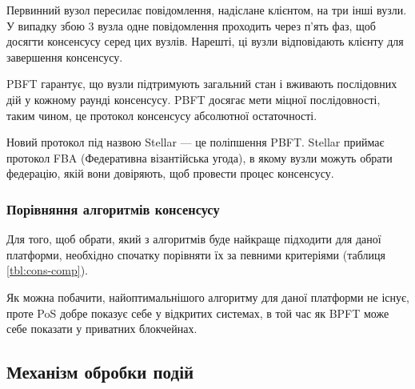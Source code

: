 \documentclass{lib/styles/default-style}
\begin{document}
    Первинний вузол пересилає повідомлення, надіслане клієнтом, на три інші вузли.
    У випадку збою 3 вузла одне повідомлення проходить через п'ять фаз, щоб досягти консенсусу серед цих вузлів.
    Нарешті, ці вузли відповідають клієнту для завершення консенсусу.

    PBFT гарантує, що вузли підтримують загальний стан і вживають послідовних дій у кожному раунді консенсусу.
    PBFT досягає мети міцної послідовності, таким чином, це протокол консенсусу абсолютної остаточності.
    
    Новий протокол під назвою Stellar --- це поліпшення PBFT.
    Stellar приймає протокол FBA (Федеративна візантійська угода), в якому вузли можуть обрати федерацію,
    якій вони довіряють, щоб провести процес консенсусу.

    \subsubsection{Порівняння алгоритмів консенсусу}

    Для того, щоб обрати, який з алгоритмів буде найкраще підходити для
    даної платформи, необхідно спочатку порівняти їх за певними критеріями (таблиця \ref{tbl:cons-comp}).

    
    Як можна побачити, найоптимальнішого алгоритму для даної платформи не існує, проте PoS добре показує себе у відкритих системах,
    в той час як BPFT може себе показати у приватних блокчейнах.

\subsection{Механізм обробки подій}
\end{document}
